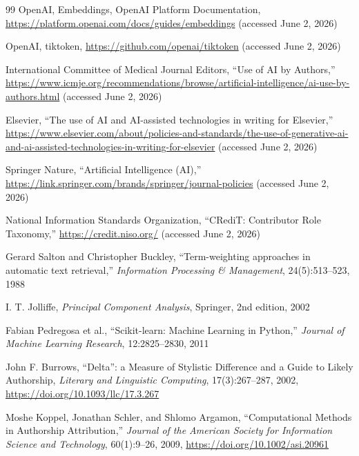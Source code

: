 \documentclass[uplatex,dvipdfmx,11pt,a4paper]{jsarticle}
\begin{document}
\begin{thebibliography}{99}
OpenAI,
\newblock Embeddings, OpenAI Platform Documentation,
\newblock \url{https://platform.openai.com/docs/guides/embeddings} (accessed June 2, 2026)

OpenAI,
\newblock tiktoken,
\newblock \url{https://github.com/openai/tiktoken} (accessed June 2, 2026)

International Committee of Medical Journal Editors,
\newblock ``Use of AI by Authors,''
\newblock \url{https://www.icmje.org/recommendations/browse/artificial-intelligence/ai-use-by-authors.html} (accessed June 2, 2026)

Elsevier,
\newblock ``The use of AI and AI-assisted technologies in writing for Elsevier,''
\newblock \url{https://www.elsevier.com/about/policies-and-standards/the-use-of-generative-ai-and-ai-assisted-technologies-in-writing-for-elsevier} (accessed June 2, 2026)

Springer Nature,
\newblock ``Artificial Intelligence (AI),''
\newblock \url{https://link.springer.com/brands/springer/journal-policies} (accessed June 2, 2026)

National Information Standards Organization,
\newblock ``CRediT: Contributor Role Taxonomy,''
\newblock \url{https://credit.niso.org/} (accessed June 2, 2026)

Gerard Salton and Christopher Buckley,
\newblock ``Term-weighting approaches in automatic text retrieval,''
\newblock \textit{Information Processing \& Management}, 24(5):513--523, 1988

I. T. Jolliffe,
\newblock \textit{Principal Component Analysis},
\newblock Springer, 2nd edition, 2002

Fabian Pedregosa et al.,
\newblock ``Scikit-learn: Machine Learning in Python,''
\newblock \textit{Journal of Machine Learning Research}, 12:2825--2830, 2011

John F. Burrows,
\newblock ``Delta'': a Measure of Stylistic Difference and a Guide to Likely Authorship,
\newblock \textit{Literary and Linguistic Computing}, 17(3):267--287, 2002,
\newblock \url{https://doi.org/10.1093/llc/17.3.267}

Moshe Koppel, Jonathan Schler, and Shlomo Argamon,
\newblock ``Computational Methods in Authorship Attribution,''
\newblock \textit{Journal of the American Society for Information Science and Technology}, 60(1):9--26, 2009,
\newblock \url{https://doi.org/10.1002/asi.20961}


\end{thebibliography}
\end{document}
